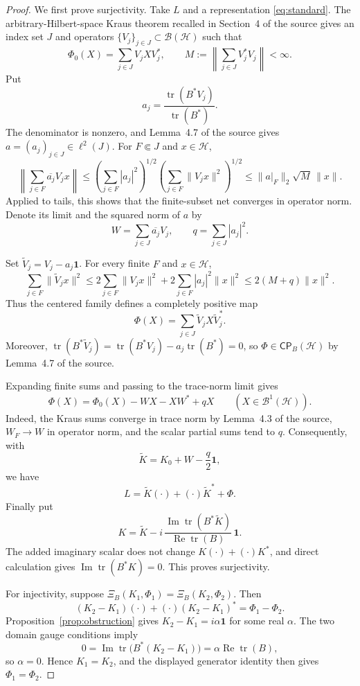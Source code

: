 \documentclass[11pt]{article}
\newcommand{\Hh}{\mathcal H}
\newcommand{\Bcal}{\mathcal B}
\newcommand{\CP}{\mathsf{CP}}
\newcommand{\tr}{\operatorname{tr}}
\newcommand{\id}{\mathbf 1}
\begin{document}
\begin{proof}
We first prove surjectivity.  Take $L$ and a representation
\eqref{eq:standard}.  The arbitrary-Hilbert-space Kraus theorem recalled in
Section~4 of the source gives an index set $J$ and operators
$\{V_j\}_{j\in J}\subset\Bcal(\Hh)$ such that
\[
 \Phi_0(X)=\sum_{j\in J}V_jXV_j^*,\qquad
 M:=\left\|\sum_{j\in J}V_j^*V_j\right\|<\infty.
\]
Put
\[
 a_j=\frac{\tr(B^*V_j)}{\tr(B^*)}.
\]
The denominator is nonzero, and Lemma~4.7 of the source gives
$a=(a_j)_{j\in J}\in\ell^2(J)$.  For $F\Subset J$ and $x\in\Hh$,
\[
 \left\|\sum_{j\in F}\overline{a_j}V_jx\right\|
 \leq\left(\sum_{j\in F}|a_j|^2\right)^{1/2}
      \left(\sum_{j\in F}\|V_jx\|^2\right)^{1/2}
 \leq\|a|_F\|_2\sqrt M\,\|x\|.
\]
Applied to tails, this shows that the finite-subset net converges in operator
norm.  Denote its limit and the squared norm of $a$ by
\[
 W=\sum_{j\in J}\overline{a_j}V_j,
 \qquad q=\sum_{j\in J}|a_j|^2.
\]

Set $\widetilde V_j=V_j-a_j\id$.  For every finite $F$ and $x\in\Hh$,
\[
 \sum_{j\in F}\|\widetilde V_jx\|^2
 \leq2\sum_{j\in F}\|V_jx\|^2
     +2\sum_{j\in F}|a_j|^2\|x\|^2
 \leq2(M+q)\|x\|^2.
\]
Thus the centered family defines a completely positive map
\[
 \Phi(X)=\sum_{j\in J}\widetilde V_jX\widetilde V_j^*.
\]
Moreover,
$\tr(B^*\widetilde V_j)=\tr(B^*V_j)-a_j\tr(B^*)=0$,
so $\Phi\in\CP_B(\Hh)$ by Lemma~4.7 of the source.

Expanding finite sums and passing to the trace-norm limit gives
\[
 \Phi(X)=\Phi_0(X)-WX-XW^*+qX
 \qquad(X\in\Bcal^1(\Hh)).
\]
Indeed, the Kraus sums converge in trace norm by Lemma~4.3 of the source,
$W_F\to W$ in operator norm, and the scalar partial sums tend to $q$.
Consequently, with
\[
 \widetilde K=K_0+W-\frac q2\id,
\]
we have
\[
 L=\widetilde K(\cdot)+(\cdot)\widetilde K^*+\Phi.
\]
Finally put
\[
 K=\widetilde K-i\,
 \frac{\operatorname{Im}\tr(B^*\widetilde K)}
      {\operatorname{Re}\tr(B)}\,\id.
\]
The added imaginary scalar does not change
$K(\cdot)+(\cdot)K^*$, and direct calculation gives
$\operatorname{Im}\tr(B^*K)=0$.  This proves surjectivity.

For injectivity, suppose
$\Xi_B(K_1,\Phi_1)=\Xi_B(K_2,\Phi_2)$.  Then
\[
 (K_2-K_1)(\cdot)+(\cdot)(K_2-K_1)^*=\Phi_1-\Phi_2.
\]
Proposition~\ref{prop:obstruction} gives
$K_2-K_1=i\alpha\id$ for some real $\alpha$.  The two domain gauge
conditions imply
\[
0=\operatorname{Im}\tr\bigl(B^*(K_2-K_1)\bigr)
 =\alpha\operatorname{Re}\tr(B),
\]
so $\alpha=0$.  Hence $K_1=K_2$, and the displayed generator identity then
gives $\Phi_1=\Phi_2$.
\end{proof}
\end{document}
